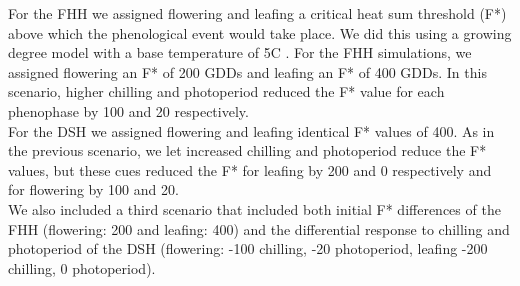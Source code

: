\documentclass{article}\usepackage[]{graphicx}\usepackage[]{color}
\begin{document}
\noindent For the FHH we assigned flowering and leafing a critical heat sum threshold (F*) above which the phenological event would take place. We did this using a growing degree model with a base temperature of 5\degree C \citep{Fu:2014aa}. For the FHH simulations, we assigned flowering an F* of 200 GDDs and leafing an F* of 400 GDDs. In this scenario, higher chilling and photoperiod reduced the F* value for each phenophase by 100 and 20 respectively.\\

\noindent For the DSH we assigned flowering and leafing identical F* values of 400. As in the previous scenario, we let increased chilling and photoperiod reduce the F* values, but these cues reduced the F* for leafing by 200 and 0 respectively and for flowering by 100 and 20.\\

\noindent We also included a third scenario that included both initial F* differences of the FHH (flowering: 200 and leafing: 400) and the differential response to chilling and photoperiod of the DSH (flowering: -100 chilling, -20 photoperiod, leafing -200 chilling, 0 photoperiod).

 
\end{document}
